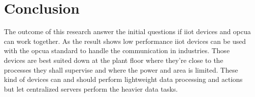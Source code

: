 \section{Conclusion} \label{conclusion}
The outcome of this research answer the initial questions if \acrshort{iiot} devices and \acrshort{opcua} can work together. As the result shows low performance \acrshort{iiot} devices can be used with the \acrshort{opcua} standard to handle the communication in industries. Those devices are best suited down at the plant floor where they're close to the processes they shall supervise and where the power and area is limited. These kind of devices can and should perform lightweight data processing and actions but let centralized servers perform the heavier data tasks. 